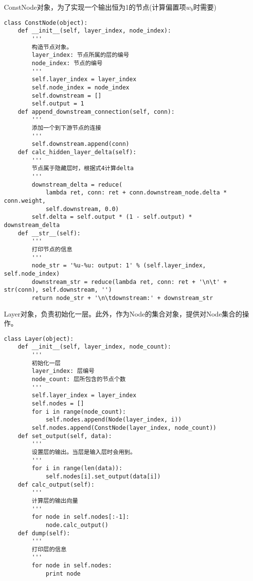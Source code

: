 ConstNode对象，为了实现一个输出恒为1的节点(计算偏置项\(w_b\)时需要)
\begin{lstlisting}
class ConstNode(object):
    def __init__(self, layer_index, node_index):
        '''
        构造节点对象。
        layer_index: 节点所属的层的编号
        node_index: 节点的编号
        '''    
        self.layer_index = layer_index
        self.node_index = node_index
        self.downstream = []
        self.output = 1
    def append_downstream_connection(self, conn):
        '''
        添加一个到下游节点的连接
        '''       
        self.downstream.append(conn)
    def calc_hidden_layer_delta(self):
        '''
        节点属于隐藏层时，根据式4计算delta
        '''
        downstream_delta = reduce(
            lambda ret, conn: ret + conn.downstream_node.delta * conn.weight,
            self.downstream, 0.0)
        self.delta = self.output * (1 - self.output) * downstream_delta
    def __str__(self):
        '''
        打印节点的信息
        '''
        node_str = '%u-%u: output: 1' % (self.layer_index, self.node_index)
        downstream_str = reduce(lambda ret, conn: ret + '\n\t' + str(conn), self.downstream, '')
        return node_str + '\n\tdownstream:' + downstream_str
\end{lstlisting}


Layer对象，负责初始化一层。此外，作为Node的集合对象，提供对Node集合的操作。
\begin{lstlisting}
class Layer(object):
    def __init__(self, layer_index, node_count):
        '''
        初始化一层
        layer_index: 层编号
        node_count: 层所包含的节点个数
        '''
        self.layer_index = layer_index
        self.nodes = []
        for i in range(node_count):
            self.nodes.append(Node(layer_index, i))
        self.nodes.append(ConstNode(layer_index, node_count))
    def set_output(self, data):
        '''
        设置层的输出。当层是输入层时会用到。
        '''
        for i in range(len(data)):
            self.nodes[i].set_output(data[i])
    def calc_output(self):
        '''
        计算层的输出向量
        '''
        for node in self.nodes[:-1]:
            node.calc_output()
    def dump(self):
        '''
        打印层的信息
        '''
        for node in self.nodes:
            print node
\end{lstlisting}

